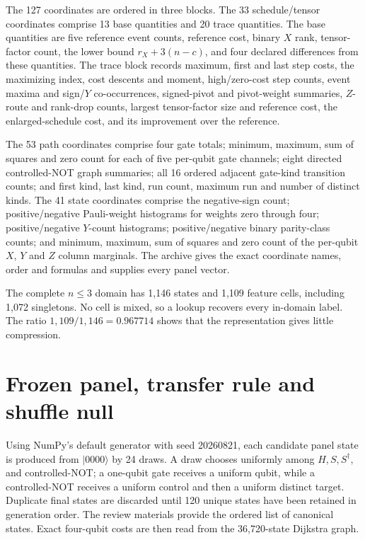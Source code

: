 \documentclass[a4paper,onecolumn,11pt,unpublished,noarxiv]{quantumarticle}
\begin{document}
The 127 coordinates are ordered in three blocks.  The 33 schedule/tensor coordinates comprise 13 base quantities and 20 trace quantities.  The base quantities are five reference event counts, reference cost, binary $X$ rank, tensor-factor count, the lower bound $r_X+3(n-c)$, and four declared differences from these quantities.  The trace block records maximum, first and last step costs, the maximizing index, cost descents and moment, high/zero-cost step counts, event maxima and sign/$Y$ co-occurrences, signed-pivot and pivot-weight summaries, $Z$-route and rank-drop counts, largest tensor-factor size and reference cost, the enlarged-schedule cost, and its improvement over the reference.

The 53 path coordinates comprise four gate totals; minimum, maximum, sum of squares and zero count for each of five per-qubit gate channels; eight directed controlled-NOT graph summaries; all 16 ordered adjacent gate-kind transition counts; and first kind, last kind, run count, maximum run and number of distinct kinds.  The 41 state coordinates comprise the negative-sign count; positive/negative Pauli-weight histograms for weights zero through four; positive/negative $Y$-count histograms; positive/negative binary parity-class counts; and minimum, maximum, sum of squares and zero count of the per-qubit $X$, $Y$ and $Z$ column marginals.  The archive gives the exact coordinate names, order and formulas and supplies every panel vector.

The complete $n\le3$ domain has 1,146 states and 1,109 feature cells, including 1,072 singletons.  No cell is mixed, so a lookup recovers every in-domain label.  The ratio $1{,}109/1{,}146=0.967714$ shows that the representation gives little compression.

\StateCountsTable
\FloatBarrier

\section{Frozen panel, transfer rule and shuffle null}\label{sec:null}

Using NumPy's default generator with seed 20260821, each candidate panel state is produced from $|0000\rangle$ by 24 draws.  A draw chooses uniformly among $H,S,S^\dagger,$ and controlled-NOT; a one-qubit gate receives a uniform qubit, while a controlled-NOT receives a uniform control and then a uniform distinct target.  Duplicate final states are discarded until 120 unique states have been retained in generation order.  The review materials provide the ordered list of canonical states.  Exact four-qubit costs are then read from the 36,720-state Dijkstra graph.
\end{document}
